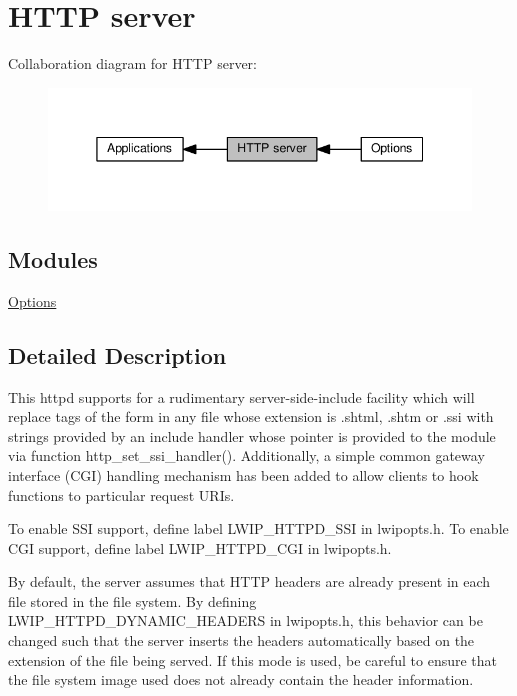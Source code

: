 \hypertarget{group__httpd}{}\section{H\+T\+TP server}
\label{group__httpd}
Collaboration diagram for H\+T\+TP server\+:
\nopagebreak
\begin{figure}[H]
\begin{center}
\leavevmode
\includegraphics[width=345pt]{group__httpd}
\end{center}
\end{figure}
\subsection*{Modules}
\begin{DoxyCompactItemize}
\item 
\hyperlink{group__httpd__opts}{Options}
\end{DoxyCompactItemize}


\subsection{Detailed Description}
This httpd supports for a rudimentary server-\/side-\/include facility which will replace tags of the form in any file whose extension is .shtml, .shtm or .ssi with strings provided by an include handler whose pointer is provided to the module via function http\+\_\+set\+\_\+ssi\+\_\+handler(). Additionally, a simple common gateway interface (C\+GI) handling mechanism has been added to allow clients to hook functions to particular request U\+R\+Is.

To enable S\+SI support, define label L\+W\+I\+P\+\_\+\+H\+T\+T\+P\+D\+\_\+\+S\+SI in lwipopts.\+h. To enable C\+GI support, define label L\+W\+I\+P\+\_\+\+H\+T\+T\+P\+D\+\_\+\+C\+GI in lwipopts.\+h.

By default, the server assumes that H\+T\+TP headers are already present in each file stored in the file system. By defining L\+W\+I\+P\+\_\+\+H\+T\+T\+P\+D\+\_\+\+D\+Y\+N\+A\+M\+I\+C\+\_\+\+H\+E\+A\+D\+E\+RS in lwipopts.\+h, this behavior can be changed such that the server inserts the headers automatically based on the extension of the file being served. If this mode is used, be careful to ensure that the file system image used does not already contain the header information.

